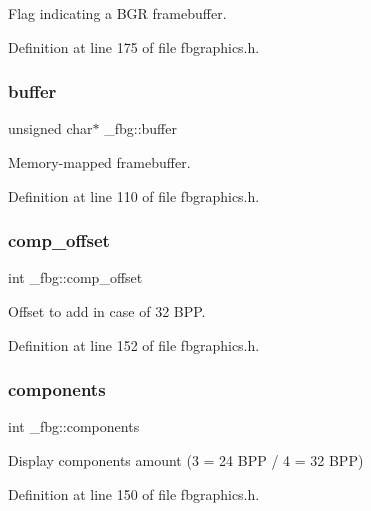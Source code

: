 Flag indicating a B\+GR framebuffer. 



Definition at line 175 of file fbgraphics.\+h.

\mbox{\label{struct__fbg_abd19f36337c99f866e03eb88f6c2a9d5}} 
\subsubsection{\texorpdfstring{buffer}{buffer}}
{\footnotesize\ttfamily unsigned char$\ast$ \+\_\+fbg\+::buffer}



Memory-\/mapped framebuffer. 



Definition at line 110 of file fbgraphics.\+h.

\mbox{\label{struct__fbg_a7c2e64d2f40575c8a989c759c30acb0e}} 
\subsubsection{\texorpdfstring{comp\+\_\+offset}{comp\_offset}}
{\footnotesize\ttfamily int \+\_\+fbg\+::comp\+\_\+offset}



Offset to add in case of 32 B\+PP. 



Definition at line 152 of file fbgraphics.\+h.

\mbox{\label{struct__fbg_a1db77a2ef506723a575644dbc1cfb747}} 
\subsubsection{\texorpdfstring{components}{components}}
{\footnotesize\ttfamily int \+\_\+fbg\+::components}



Display components amount (3 = 24 B\+PP / 4 = 32 B\+PP) 



Definition at line 150 of file fbgraphics.\+h.

